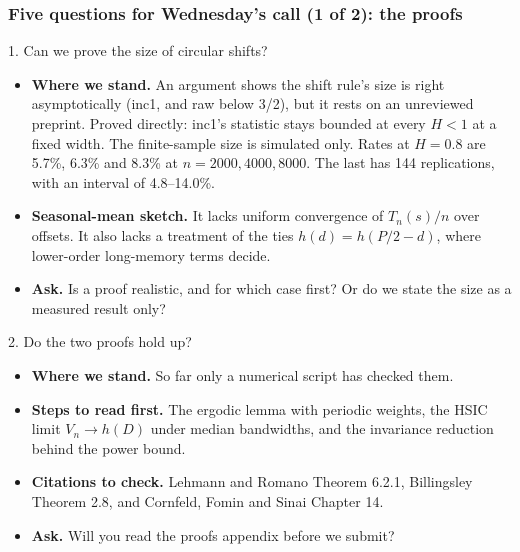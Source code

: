 \documentclass[11pt, aspectratio=169, xcolor={dvipsnames}]{beamer}
\begin{document}
\begin{frame}
\frametitle{Five questions for Wednesday's call (1 of 2): the proofs}
\begin{block}{1. Can we prove the size of circular shifts?}\footnotesize
\begin{itemize}
\item \textbf{Where we stand.} An argument shows the shift rule's size is right asymptotically (inc1, and raw below 3/2), but it rests on an unreviewed preprint. Proved directly: inc1's statistic stays bounded at every $H<1$ at a fixed width. The finite-sample size is simulated only. Rates at $H=0.8$ are 5.7\%, 6.3\% and 8.3\% at $n=2000, 4000, 8000$. The last has 144 replications, with an interval of 4.8--14.0\%.
\item \textbf{Seasonal-mean sketch.} It lacks uniform convergence of $T_n(s)/n$ over offsets. It also lacks a treatment of the ties $h(d)=h(P/2-d)$, where lower-order long-memory terms decide.
\item \textbf{Ask.} Is a proof realistic, and for which case first? Or do we state the size as a measured result only?
\end{itemize}
\end{block}
\begin{block}{2. Do the two proofs hold up?}\footnotesize
\begin{itemize}
\item \textbf{Where we stand.} So far only a numerical script has checked them.
\item \textbf{Steps to read first.} The ergodic lemma with periodic weights, the HSIC limit $V_n\to h(D)$ under median bandwidths, and the invariance reduction behind the power bound.
\item \textbf{Citations to check.} Lehmann and Romano Theorem 6.2.1, Billingsley Theorem 2.8, and Cornfeld, Fomin and Sinai Chapter 14.
\item \textbf{Ask.} Will you read the proofs appendix before we submit?
\end{itemize}
\end{block}
\end{frame}
\end{document}
